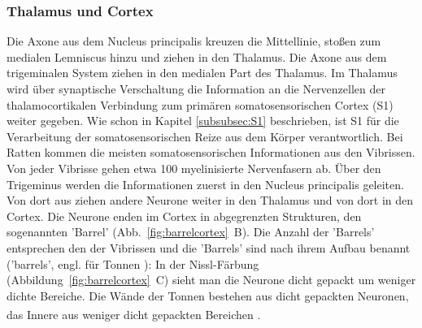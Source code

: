 \documentclass[12pt,a4paper,pdftex]{article}
\begin{document}
\subsubsection*{Thalamus und Cortex}
Die Axone aus dem Nucleus principalis kreuzen die Mittellinie, stoßen zum medialen Lemniscus hinzu und ziehen in den Thalamus. Die Axone aus dem trigeminalen System ziehen in den medialen Part des Thalamus. Im Thalamus wird über synaptische Verschaltung die Information an die Nervenzellen der thalamocortikalen Verbindung zum primären somatosensorischen Cortex (S1) weiter gegeben. 
Wie schon in Kapitel \ref{subsubsec:S1} beschrieben, ist S1 für die Verarbeitung der somatosensorischen Reize aus dem Körper verantwortlich. Bei Ratten kommen die meisten somatosensorischen Informationen aus den Vibrissen. Von jeder Vibrisse gehen etwa 100 myelinisierte Nervenfasern ab. Über den Trigeminus werden die Informationen zuerst in den Nucleus principalis geleiten. Von dort aus ziehen andere Neurone weiter in den Thalamus und von dort in den Cortex. Die Neurone enden im Cortex   in abgegrenzten Strukturen, den sogenannten 'Barrel' (Abb.~\ref{fig:barrelcortex}~B). Die Anzahl der 'Barrels' entsprechen den der Vibrissen und die 'Barrels' sind nach ihrem Aufbau benannt ('barrels', engl. für Tonnen ): In der Nissl-Färbung (Abbildung~\ref{fig:barrelcortex}~C) sieht man die Neurone dicht gepackt um weniger dichte Bereiche. Die Wände der Tonnen bestehen aus dicht gepackten Neuronen, das Innere aus weniger dicht gepackten Bereichen \textsuperscript{\cite[8]{smith2008biology}}. 
\end{document}
